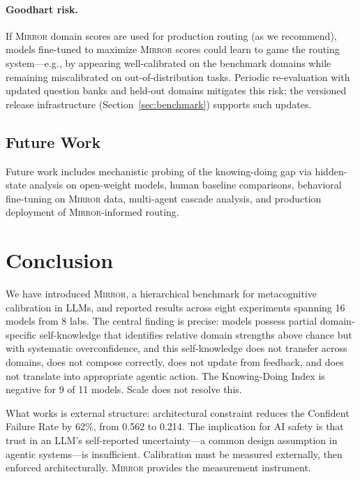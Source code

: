 \documentclass[10pt]{article}
\newcommand{\mirror}{\textsc{Mirror}}
\begin{document}
\paragraph{Goodhart risk.} If \mirror{} domain scores are used for production routing (as we recommend), models fine-tuned to maximize \mirror{} scores could learn to game the routing system---e.g., by appearing well-calibrated on the benchmark domains while remaining miscalibrated on out-of-distribution tasks. Periodic re-evaluation with updated question banks and held-out domains mitigates this risk; the versioned release infrastructure (Section~\ref{sec:benchmark}) supports such updates.

\subsection{Future Work}

Future work includes mechanistic probing of the knowing-doing gap via hidden-state analysis on open-weight models, human baseline comparisons, behavioral fine-tuning on \mirror{} data, multi-agent cascade analysis, and production deployment of \mirror{}-informed routing.

\vspace{-1mm}
\section{Conclusion}
\label{sec:conclusion}

We have introduced \mirror{}, a hierarchical benchmark for metacognitive
calibration in LLMs, and reported results across eight experiments spanning 16
models from 8 labs. The central finding is precise: models possess partial domain-specific
self-knowledge that identifies relative domain strengths above chance but with
systematic overconfidence, and this self-knowledge
does not transfer across domains, does not compose correctly, does not update from
feedback, and does not translate into appropriate agentic action. The Knowing-Doing
Index is negative for 9 of 11 models. Scale does not resolve this.

What works is external structure: architectural constraint reduces the Confident
Failure Rate by 62\%, from 0.562 to 0.214. The implication for AI safety is that
trust in an LLM's self-reported uncertainty---a common design assumption in agentic
systems---is insufficient. Calibration must be measured externally, then enforced
architecturally. \mirror{} provides the measurement instrument.
\end{document}
